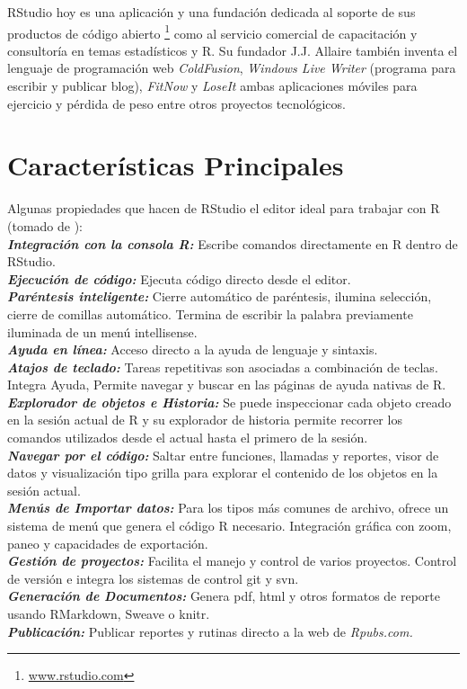 \documentclass[
]{book}
\begin{document}
RStudio hoy es una aplicación y una fundación dedicada al soporte de sus productos de código abierto \footnote{\href{https://www.rstudio.com/}{www.rstudio.com}} como al servicio comercial de capacitación y consultoría en temas estadísticos y R. Su fundador J.J. Allaire también inventa el lenguaje de programación web \emph{ColdFusion}, \emph{Windows Live Writer} (programa para escribir y publicar blog), \emph{FitNow} y \emph{LoseIt} ambas aplicaciones móviles para ejercicio y pérdida de peso entre otros proyectos tecnológicos.

\hypertarget{car-prin}{%
\section{Características Principales}\label{car-prin}}

Algunas propiedades que hacen de RStudio el editor ideal para trabajar con R (tomado de \citet{Loo2012}):\\
\textbf{\emph{Integración con la consola R:}} Escribe comandos directamente en R dentro de RStudio.\\
\textbf{\emph{Ejecución de código:}} Ejecuta código directo desde el editor.\\
\textbf{\emph{Paréntesis inteligente:}} Cierre automático de paréntesis, ilumina selección, cierre de comillas automático. Termina de escribir la palabra previamente iluminada de un menú intellisense.\\
\textbf{\emph{Ayuda en línea:}} Acceso directo a la ayuda de lenguaje y sintaxis.\\
\textbf{\emph{Atajos de teclado:}} Tareas repetitivas son asociadas a combinación de teclas. Integra Ayuda, Permite navegar y buscar en las páginas de ayuda nativas de R.\\
\textbf{\emph{Explorador de objetos e Historia:}} Se puede inspeccionar cada objeto creado en la sesión actual de R y su explorador de historia permite recorrer los comandos utilizados desde el actual hasta el primero de la sesión.\\
\textbf{\emph{Navegar por el código:}} Saltar entre funciones, llamadas y reportes, visor de datos y visualización tipo grilla para explorar el contenido de los objetos en la sesión actual.\\
\textbf{\emph{Menús de Importar datos:}} Para los tipos más comunes de archivo, ofrece un sistema de menú que genera el código R necesario. Integración gráfica con zoom, paneo y capacidades de exportación.\\
\textbf{\emph{Gestión de proyectos:}} Facilita el manejo y control de varios proyectos. Control de versión e integra los sistemas de control git y svn.\\
\textbf{\emph{Generación de Documentos:}} Genera pdf, html y otros formatos de reporte usando RMarkdown, Sweave o knitr.\\
\textbf{\emph{Publicación:}} Publicar reportes y rutinas directo a la web de \emph{Rpubs.com.}
\end{document}
